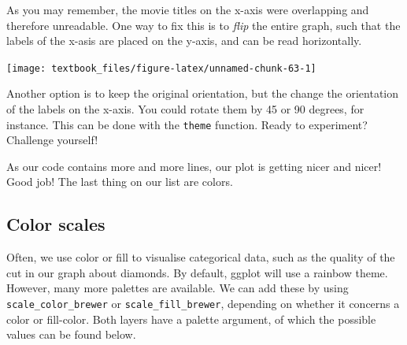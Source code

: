 \documentclass[]{tufte-book}
\newenvironment{Shaded}{}{}
\newcommand{\DecValTok}[1]{\textcolor[rgb]{0.25,0.63,0.44}{#1}}
\newcommand{\KeywordTok}[1]{\textcolor[rgb]{0.00,0.44,0.13}{\textbf{#1}}}
\newcommand{\NormalTok}[1]{#1}
\newcommand{\OperatorTok}[1]{\textcolor[rgb]{0.40,0.40,0.40}{#1}}
\newcommand{\StringTok}[1]{\textcolor[rgb]{0.25,0.44,0.63}{#1}}
\begin{document}
As you may remember, the movie titles on the x-axis were overlapping and therefore unreadable. One way to fix this is to \emph{flip} the entire graph, such that the labels of the x-asis are placed on the y-axis, and can be read horizontally.

\begin{Shaded}
\end{Shaded}

\texttt{[image: textbook\_files/figure-latex/unnamed-chunk-63-1]}

Another option is to keep the original orientation, but the change the orientation of the labels on the x-axis. You could rotate them by 45 or 90 degrees, for instance. This can be done with the \texttt{theme} function. Ready to experiment? Challenge yourself!

As our code contains more and more lines, our plot is getting nicer and nicer! Good job! The last thing on our list are colors.

\hypertarget{color-scales}{%
\subsection{Color scales}\label{color-scales}}

Often, we use color or fill to visualise categorical data, such as the quality of the cut in our graph about diamonds. By default, ggplot will use a rainbow theme. However, many more palettes are available. We can add these by using \texttt{scale\_color\_brewer} or \texttt{scale\_fill\_brewer}, depending on whether it concerns a color or fill-color. Both layers have a palette argument, of which the possible values can be found below.
\end{document}
